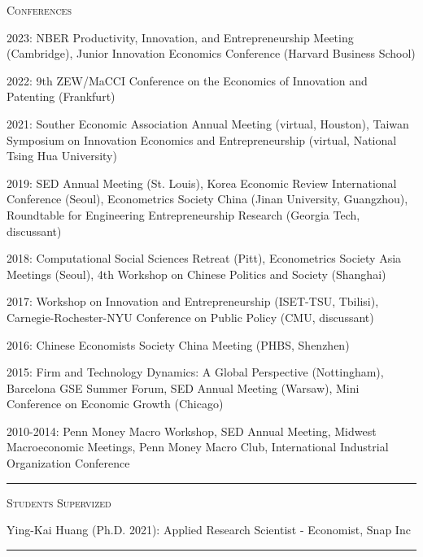 \documentclass{article}
\begin{document}
\parbox{\textwidth}{
\parbox[t]{0.28\textwidth}{ \raggedright \noindent \textsc{ Conferences } }
\parbox[t]{0.72\textwidth}{ \raggedright

2023: NBER Productivity, Innovation, and Entrepreneurship Meeting (Cambridge), Junior Innovation Economics Conference (Harvard Business School)
\vspace{0.27cm}

2022: 9th ZEW/MaCCI Conference on the Economics of Innovation and Patenting (Frankfurt)
\vspace{0.27cm}

2021: Souther Economic Association Annual Meeting (virtual, Houston), Taiwan Symposium on Innovation Economics and Entrepreneurship (virtual, National Tsing Hua University)
\vspace{0.27cm}

2019: SED Annual Meeting (St. Louis), Korea Economic Review International Conference (Seoul), Econometrics Society China (Jinan University, Guangzhou), Roundtable for Engineering Entrepreneurship Research (Georgia Tech, discussant)
\vspace{0.27cm}

2018: Computational Social Sciences Retreat (Pitt), Econometrics Society Asia Meetings (Seoul), 4th Workshop on Chinese Politics and Society (Shanghai)
\vspace{0.27cm}

2017: Workshop on Innovation and Entrepreneurship (ISET-TSU, Tbilisi), Carnegie-Rochester-NYU Conference on Public Policy (CMU, discussant)
\vspace{0.27cm}

2016: Chinese Economists Society China Meeting (PHBS, Shenzhen)
\vspace{0.27cm}

2015: Firm and Technology Dynamics: A Global Perspective (Nottingham), Barcelona GSE Summer Forum, SED Annual Meeting (Warsaw), Mini Conference on Economic Growth (Chicago)
\vspace{0.27cm}

2010-2014: Penn Money Macro Workshop, SED Annual Meeting, Midwest Macroeconomic Meetings, Penn Money Macro Club, International Industrial Organization Conference
\vspace{0.27cm}

}
\textcolor{light-gray}{\hrule}
}
\vspace{0.3cm}

\parbox{\textwidth}{
\parbox[t]{0.28\textwidth}{ \raggedright \noindent \textsc{ Students Supervized } }
\parbox[t]{0.72\textwidth}{ \raggedright

Ying-Kai Huang (Ph.D. 2021): Applied Research Scientist - Economist, Snap Inc
\vspace{0.27cm}

}
\textcolor{light-gray}{\hrule}
}
\vspace{0.3cm}
\end{document}
